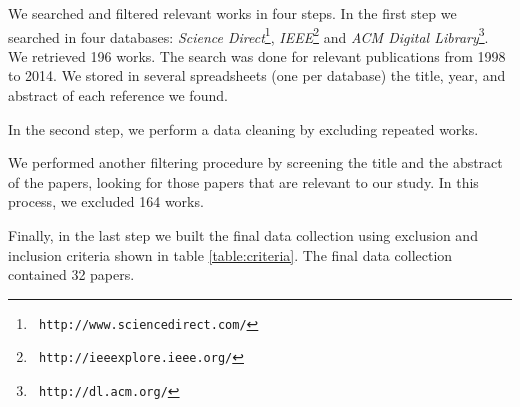 % 

We searched and filtered relevant works in four steps. 
In the first  step we
searched in four databases: \textit{Science Direct}\footnote{\tt
http://www.sciencedirect.com/}, \textit{IEEE}\footnote{\tt
http://ieeexplore.ieee.org/} and \textit{ACM Digital Library}\footnote{\tt
http://dl.acm.org/}. %
We retrieved 196 works. 
The search was done for relevant publications from 1998 to 2014. 
We stored in several spreadsheets (one per database) the title, year,  and abstract of each reference we found. 

In the second step, we perform a data cleaning by excluding repeated works.  

We performed another filtering procedure by screening the title and the abstract
of the papers, looking for those papers that are relevant to our study.
In this process, we excluded 164 works. 
 
Finally, in the last step we built the final data collection using exclusion
and inclusion criteria shown in table \ref{table:criteria}. The final data
collection contained 32 papers.


